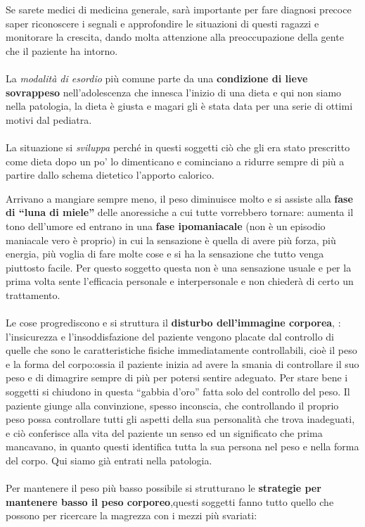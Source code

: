 Se sarete medici di medicina generale, sarà importante per fare diagnosi
precoce saper riconoscere i segnali e approfondire le situazioni di
questi ragazzi e monitorare la crescita, dando molta attenzione alla
preoccupazione della gente che il paziente ha intorno.
\\\\
La \emph{\emph{modalità di esordio}} più comune parte da una
\textbf{condizione di lieve sovrappeso} nell'adolescenza che innesca
l'inizio di una dieta e qui non siamo nella patologia, la dieta è giusta
e magari gli è stata data per una serie di ottimi motivi dal pediatra.
\\\\
La situazione si \emph{\emph{sviluppa}} perché in questi soggetti ciò
che gli era stato prescritto come dieta dopo un po' lo dimenticano e
cominciano a ridurre sempre di più a partire dallo schema dietetico
l'apporto calorico.

Arrivano a mangiare sempre meno, il peso diminuisce molto e si assiste
alla \textbf{fase di ``luna di miele''} delle anoressiche a cui tutte
vorrebbero tornare: aumenta il tono dell'umore ed entrano in una
\textbf{fase ipomaniacale} (non è un episodio maniacale vero è proprio)
in cui la sensazione è quella di avere più forza, più energia, più
voglia di fare molte cose e si ha la sensazione che tutto venga
piuttosto facile. Per questo soggetto questa non è una sensazione usuale
e per la prima volta sente l'efficacia personale e interpersonale e non
chiederà di certo un trattamento.
\\\\
Le cose progrediscono e si struttura il \textbf{disturbo dell'immagine
corporea}, : l'insicurezza e l'insoddisfazione del paziente vengono
placate dal controllo di quelle che sono le caratteristiche fisiche
immediatamente controllabili, cioè il peso e la forma del corpo:ossia il
paziente inizia ad avere la smania di controllare il suo peso e di
dimagrire sempre di più per potersi sentire adeguato. Per stare bene i
soggetti si chiudono in questa ``gabbia d'oro'' fatta solo del controllo
del peso. Il paziente giunge alla convinzione, spesso inconscia, che
controllando il proprio peso possa controllare tutti gli aspetti della
sua personalità che trova inadeguati, e ciò conferisce alla vita del
paziente un senso ed un significato che prima mancavano, in quanto
questi identifica tutta la sua persona nel peso e nella forma del corpo.
Qui siamo già entrati nella patologia.
\\\\
Per mantenere il peso più basso possibile si strutturano le
\textbf{strategie per mantenere basso il peso corporeo},questi soggetti
fanno tutto quello che possono per ricercare la magrezza con i mezzi più
svariati:

